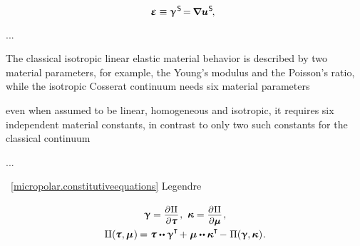 \begin{equation*}
\infinitesimaldeformation \equiv \distortiontensor^{\hspace{.2ex}\mathsf{S}}
\hspace{-0.3ex} = \hspace{-0.2ex}
\boldnabla {\fieldofdisplacements}^{\hspace{.1ex}\mathsf{S}}
\hspace{-0.25ex} , \:\:
\end{equation*}

...

{\small%
The classical isotropic linear elastic material behavior is described by two material parameters, for example, the Young’s modulus and the Poisson’s ratio, while the isotropic Cosserat continuum needs six material parameters

even when assumed to be linear, homogeneous and isotropic, it requires six independent material constants, in contrast to only two such constants for the classical continuum
\par}

...


~\eqref{micropolar.constitutiveequations}
 Legendre

\nopagebreak\vspace{-0.2em}\begin{equation}
\begin{array}{c}
\distortiontensor = \scalebox{.92}{$ \displaystyle \frac{\raisemath{-0.125em}{\partial\hspace{.1ex} \complementaryenergydensity^{\mathstrut}}}{\partial \forcestresstensor}$}
\hspace{.15ex} ,
\hspace{.8ex}
\wrynesstensor = \scalebox{.92}{$ \displaystyle \frac{\raisemath{-0.125em}{\partial\hspace{.1ex} \complementaryenergydensity^{\mathstrut}}}{\partial \couplestresstensor}$}
\hspace{.2ex} ,
\\[.8em]
%
\complementaryenergydensity(\hspace{-0.1ex} \forcestresstensor, \couplestresstensor \hspace{.12ex}) \hspace{-0.12ex}
= \forcestresstensor \dotdotp \distortiontensor^{\T} \hspace{-0.25ex}
+ \hspace{.1ex} \couplestresstensor \dotdotp \wrynesstensor^{\T} \hspace{-0.25ex}
- \hspace{.1ex} \potentialenergydensity (\distortiontensor , \wrynesstensor \hspace{.1ex})
\hspace{.1ex} .
\end{array}
\end{equation}

